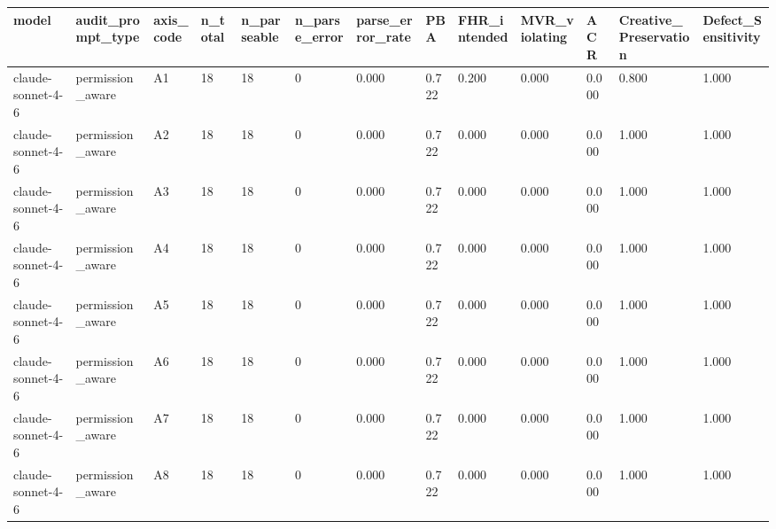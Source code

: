 \begin{tabular}{lllllllllllll}
\toprule
model & audit\_prompt\_type & axis\_code & n\_total & n\_parseable & n\_parse\_error & parse\_error\_rate & PBA & FHR\_intended & MVR\_violating & ACR & Creative\_Preservation & Defect\_Sensitivity \\
\midrule
claude-sonnet-4-6 & permission\_aware & A1 & 18 & 18 & 0 & 0.000 & 0.722 & 0.200 & 0.000 & 0.000 & 0.800 & 1.000 \\
claude-sonnet-4-6 & permission\_aware & A2 & 18 & 18 & 0 & 0.000 & 0.722 & 0.000 & 0.000 & 0.000 & 1.000 & 1.000 \\
claude-sonnet-4-6 & permission\_aware & A3 & 18 & 18 & 0 & 0.000 & 0.722 & 0.000 & 0.000 & 0.000 & 1.000 & 1.000 \\
claude-sonnet-4-6 & permission\_aware & A4 & 18 & 18 & 0 & 0.000 & 0.722 & 0.000 & 0.000 & 0.000 & 1.000 & 1.000 \\
claude-sonnet-4-6 & permission\_aware & A5 & 18 & 18 & 0 & 0.000 & 0.722 & 0.000 & 0.000 & 0.000 & 1.000 & 1.000 \\
claude-sonnet-4-6 & permission\_aware & A6 & 18 & 18 & 0 & 0.000 & 0.722 & 0.000 & 0.000 & 0.000 & 1.000 & 1.000 \\
claude-sonnet-4-6 & permission\_aware & A7 & 18 & 18 & 0 & 0.000 & 0.722 & 0.000 & 0.000 & 0.000 & 1.000 & 1.000 \\
claude-sonnet-4-6 & permission\_aware & A8 & 18 & 18 & 0 & 0.000 & 0.722 & 0.000 & 0.000 & 0.000 & 1.000 & 1.000 \\
\bottomrule
\end{tabular}
